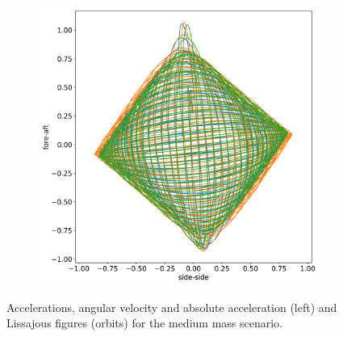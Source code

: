 \documentclass{article}
\begin{document}
\begin{figure}
\begin{subfigure}[b]{0.45\textwidth}
        \includegraphics[width=\textwidth]{results/experiment/medium_mass_orbit.png}
        \caption{}
        \label{fig:medium-mass:orbit}
    \end{subfigure}
    
    \caption{Accelerations, angular velocity and absolute acceleration (left) and Lissajous figures (orbits) for the medium mass scenario.}
    \label{fig:medium-mass}
\end{figure}

\end{document}
